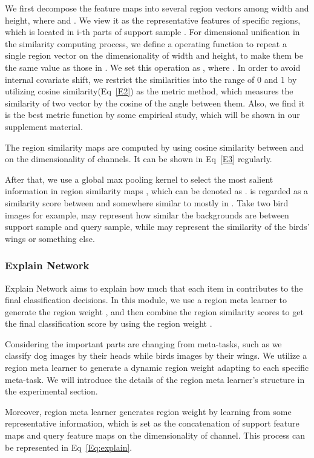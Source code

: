 \documentclass[letterpaper]{article}
\begin{document}
We first decompose the feature maps  into several region vectors  among width and height, where  and . We view it as the representative features of specific regions, which is located in i-th parts of support sample . For dimensional unification in the similarity computing process, we define a operating function  to repeat a single region vector  on the dimensionality of width and height, to make them be the same value as those in . We set this operation as , where . In order to avoid internal covariate shift, we restrict the similarities into the range of 0 and 1 by utilizing cosine similarity(Eq~\ref{E2}) as the metric method, which measures the similarity of two vector by the cosine of the angle between them. Also, we find it is the best metric function by some empirical study, which will be shown in our supplement material.


The region similarity maps  are computed by using cosine similarity between  and on the dimensionality of channels. It can be shown in Eq~\ref{E3} regularly.



After that, we use a global max pooling kernel to select the most salient information in region similarity maps , which can be denoted as .  is regarded as a similarity score between  and somewhere similar to  mostly in . Take two bird images for example,  may represent how similar the backgrounds are between support sample and query sample, while  may represent the similarity of the birds' wings or something else. 

\subsubsection{Explain Network}\label{subsubsection:explain}
Explain Network aims to explain how much that each item in  contributes to the final classification decisions. In this module, we use a region meta learner to generate the region weight , and then combine the region similarity scores  to get the final classification score by using the region weight .

Considering the important parts are changing from meta-tasks, such as we classify dog images by their heads while birds images by their wings. We utilize a region meta learner to generate a dynamic region weight adapting to each specific meta-task. We will introduce the details of the region meta learner's structure in the experimental section.

Moreover, region meta learner generates region weight by learning from some representative information, which is set as the concatenation of support feature maps and query feature maps on the dimensionality of channel. This process can be represented in Eq~\ref{Eq:explain}.
\end{document}
